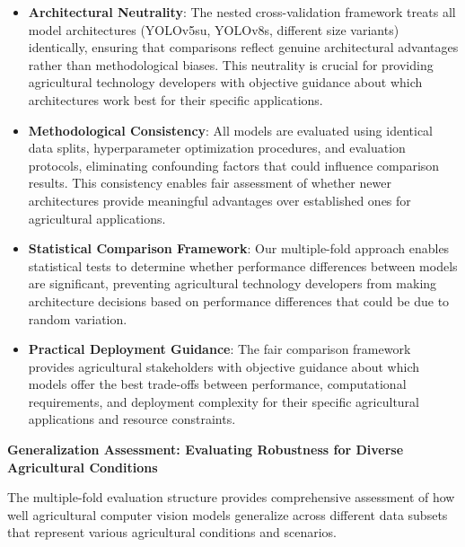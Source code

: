 \begin{itemize}
    \item \textbf{Architectural Neutrality}: The nested cross-validation framework treats all model architectures (YOLOv5su, YOLOv8s, different size variants) identically, ensuring that comparisons reflect genuine architectural advantages rather than methodological biases. This neutrality is crucial for providing agricultural technology developers with objective guidance about which architectures work best for their specific applications.
    
    \item \textbf{Methodological Consistency}: All models are evaluated using identical data splits, hyperparameter optimization procedures, and evaluation protocols, eliminating confounding factors that could influence comparison results. This consistency enables fair assessment of whether newer architectures provide meaningful advantages over established ones for agricultural applications.
    
    \item \textbf{Statistical Comparison Framework}: Our multiple-fold approach enables statistical tests to determine whether performance differences between models are significant, preventing agricultural technology developers from making architecture decisions based on performance differences that could be due to random variation.
    
    \item \textbf{Practical Deployment Guidance}: The fair comparison framework provides agricultural stakeholders with objective guidance about which models offer the best trade-offs between performance, computational requirements, and deployment complexity for their specific agricultural applications and resource constraints.
\end{itemize}

\textbf{Generalization Assessment: Evaluating Robustness for Diverse Agricultural Conditions}

The multiple-fold evaluation structure provides comprehensive assessment of how well agricultural computer vision models generalize across different data subsets that represent various agricultural conditions and scenarios.

